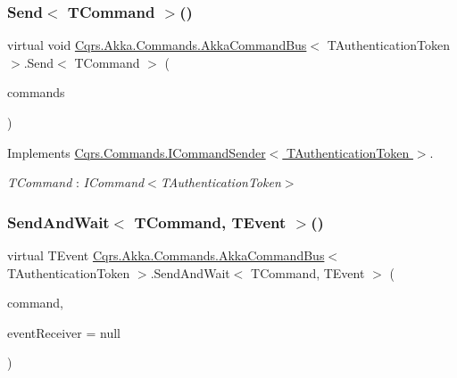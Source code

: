 \subsubsection{\texorpdfstring{Send$<$ T\+Command $>$()}{Send< TCommand >()}\hspace{0.1cm}{\footnotesize\ttfamily [2/2]}}
{\footnotesize\ttfamily virtual void \hyperlink{classCqrs_1_1Akka_1_1Commands_1_1AkkaCommandBus}{Cqrs.\+Akka.\+Commands.\+Akka\+Command\+Bus}$<$ T\+Authentication\+Token $>$.Send$<$ T\+Command $>$ (\begin{DoxyParamCaption}\item[{I\+Enumerable$<$ T\+Command $>$}]{commands }\end{DoxyParamCaption})\hspace{0.3cm}{\ttfamily [virtual]}}



Implements \hyperlink{interfaceCqrs_1_1Commands_1_1ICommandSender_a3fb3ec40a3e862f721a7c9204e67e832_a3fb3ec40a3e862f721a7c9204e67e832}{Cqrs.\+Commands.\+I\+Command\+Sender$<$ T\+Authentication\+Token $>$}.

\begin{Desc}
\item[Type Constraints]\begin{description}
\item[{\em T\+Command} : {\em I\+Command$<$T\+Authentication\+Token$>$}]\end{description}
\end{Desc}
\mbox{\label{classCqrs_1_1Akka_1_1Commands_1_1AkkaCommandBus_a10ed94fc318977777e2e6cc970b8953e_a10ed94fc318977777e2e6cc970b8953e}} 
\subsubsection{\texorpdfstring{Send\+And\+Wait$<$ T\+Command, T\+Event $>$()}{SendAndWait< TCommand, TEvent >()}\hspace{0.1cm}{\footnotesize\ttfamily [1/6]}}
{\footnotesize\ttfamily virtual T\+Event \hyperlink{classCqrs_1_1Akka_1_1Commands_1_1AkkaCommandBus}{Cqrs.\+Akka.\+Commands.\+Akka\+Command\+Bus}$<$ T\+Authentication\+Token $>$.Send\+And\+Wait$<$ T\+Command, T\+Event $>$ (\begin{DoxyParamCaption}\item[{T\+Command}]{command,  }\item[{\hyperlink{interfaceCqrs_1_1Events_1_1IEventReceiver}{I\+Event\+Receiver}$<$ T\+Authentication\+Token $>$}]{event\+Receiver = {\ttfamily null} }\end{DoxyParamCaption})\hspace{0.3cm}{\ttfamily [virtual]}}



